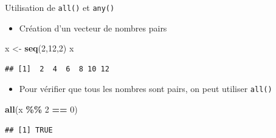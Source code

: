 \documentclass[
  ignorenonframetext,
]{beamer}
\newenvironment{Shaded}{\begin{snugshade}}{\end{snugshade}}
\newcommand{\DecValTok}[1]{\textcolor[rgb]{0.00,0.00,0.81}{#1}}
\newcommand{\FunctionTok}[1]{\textcolor[rgb]{0.13,0.29,0.53}{\textbf{#1}}}
\newcommand{\NormalTok}[1]{#1}
\newcommand{\OtherTok}[1]{\textcolor[rgb]{0.56,0.35,0.01}{#1}}
\newcommand{\SpecialCharTok}[1]{\textcolor[rgb]{0.81,0.36,0.00}{\textbf{#1}}}
\providecommand{\tightlist}{%
  \setlength{\itemsep}{0pt}\setlength{\parskip}{0pt}}
\begin{document}
\begin{frame}[fragile]{Utilisation de \texttt{all()} et \texttt{any()}}
\protect\hypertarget{utilisation-de-all-et-any}{}
\begin{itemize}
\tightlist
\item
  Création d'un vecteur de nombres pairs
\end{itemize}

\tiny

\begin{Shaded}
\begin{Highlighting}[]
\NormalTok{x }\OtherTok{\textless{}{-}} \FunctionTok{seq}\NormalTok{(}\DecValTok{2}\NormalTok{,}\DecValTok{12}\NormalTok{,}\DecValTok{2}\NormalTok{)}
\NormalTok{x }
\end{Highlighting}
\end{Shaded}

\begin{verbatim}
## [1]  2  4  6  8 10 12
\end{verbatim}

\normalsize

\begin{itemize}
\tightlist
\item
  Pour vérifier que tous les nombres sont pairs, on peut utiliser
  \texttt{all()}
\end{itemize}

\tiny

\begin{Shaded}
\begin{Highlighting}[]
\FunctionTok{all}\NormalTok{(x }\SpecialCharTok{\%\%} \DecValTok{2} \SpecialCharTok{==} \DecValTok{0}\NormalTok{)}
\end{Highlighting}
\end{Shaded}

\begin{verbatim}
## [1] TRUE
\end{verbatim}

\normalsize
\end{frame}
\end{document}
